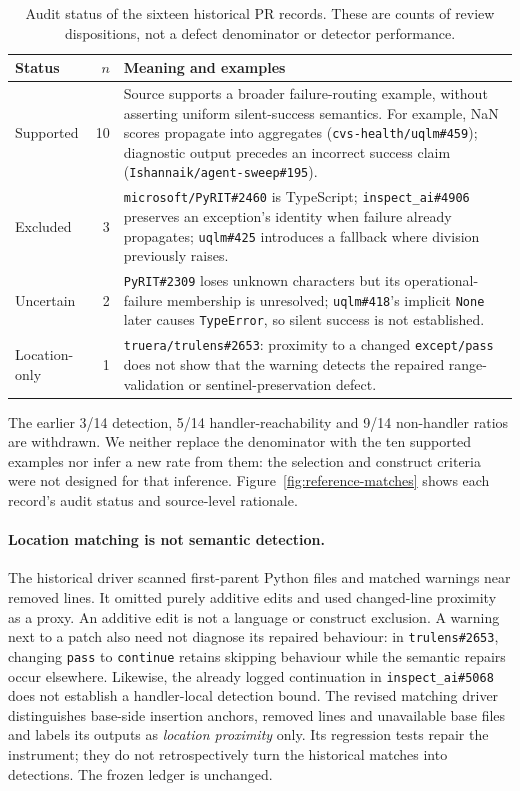 \documentclass[10pt,a4paper]{article}
\begin{document}
\begin{table}[htbp]
\centering\small
\caption{Audit status of the sixteen historical PR records. These are counts
of review dispositions, not a defect denominator or detector performance.}
\label{tab:recall}
\begin{tabular}{@{}P{2.3cm}rP{11cm}@{}}
\toprule
Status & $n$ & Meaning and examples \\
\midrule
Supported & 10 & Source supports a broader failure-routing example, without
asserting uniform silent-success semantics. For example, NaN scores propagate
into aggregates (\texttt{cvs-health/uqlm\#459}); diagnostic output precedes
an incorrect success claim (\texttt{Ishannaik/agent-sweep\#195}). \\
Excluded & 3 & \texttt{microsoft/PyRIT\#2460} is TypeScript;
\texttt{inspect\_ai\#4906} preserves an exception's identity when failure
already propagates; \texttt{uqlm\#425} introduces a fallback where division
previously raises. \\
Uncertain & 2 & \texttt{PyRIT\#2309} loses unknown characters but its
operational-failure membership is unresolved; \texttt{uqlm\#418}'s implicit
\texttt{None} later causes \texttt{TypeError}, so silent success is not established. \\
Location-only & 1 & \texttt{truera/trulens\#2653}: proximity to a changed
\texttt{except/pass} does not show that the warning detects the repaired
range-validation or sentinel-preservation defect. \\
\bottomrule
\end{tabular}
\end{table}

The earlier 3/14 detection, 5/14 handler-reachability and 9/14 non-handler
ratios are withdrawn. We neither replace the denominator with the ten
supported examples nor infer a new rate from them: the selection and
construct criteria were not designed for that inference. Figure~\ref{fig:reference-matches}
shows each record's audit status and source-level rationale.

\paragraph{Location matching is not semantic detection.}
The historical driver scanned first-parent Python files and matched warnings
near removed lines. It omitted purely additive edits and used changed-line
proximity as a proxy. An additive edit is not a language or construct
exclusion. A warning next to a patch also need not diagnose its repaired
behaviour: in \texttt{trulens\#2653}, changing \texttt{pass} to
\texttt{continue} retains skipping behaviour while the semantic repairs
occur elsewhere. Likewise, the already logged continuation in
\texttt{inspect\_ai\#5068} does not establish a handler-local detection bound.
The revised matching driver distinguishes base-side insertion anchors,
removed lines and unavailable base files and labels its outputs as
\emph{location proximity} only. Its regression tests repair the instrument;
they do not retrospectively turn the historical matches into detections.
The frozen ledger is unchanged.
\end{document}
